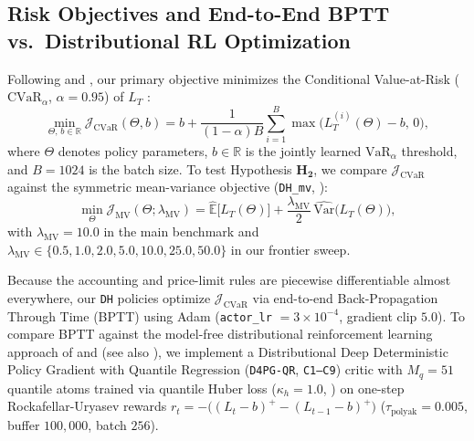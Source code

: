 \documentclass[11pt,a4paper]{article}
\begin{document}
\subsection{Risk Objectives and End-to-End BPTT vs.\ Distributional RL Optimization}
Following \citet{Buehler2019} and \citet{Rockafellar2000}, our primary objective minimizes the Conditional Value-at-Risk ($\text{CVaR}_\alpha$, $\alpha = 0.95$) of $L_T$ \citep{Carbonneau2021,Brugiere2026}:
\begin{equation}
  \min_{\Theta,\, b \in \mathbb{R}} \mathcal{J}_{\text{CVaR}}(\Theta, b) = b + \frac{1}{(1 - \alpha)B}\sum_{i=1}^{B} \max\big(L_T^{(i)}(\Theta) - b,\, 0\big),
  \label{eq:cvar_obj}
\end{equation}
where $\Theta$ denotes policy parameters, $b \in \mathbb{R}$ is the jointly learned $\text{VaR}_\alpha$ threshold, and $B = 1024$ is the batch size. To test Hypothesis $\mathbf{H_2}$, we compare $\mathcal{J}_{\text{CVaR}}$ against the symmetric mean-variance objective (\texttt{DH\_mv}, \citealt{Dai2022}):
\begin{equation}
  \min_{\Theta} \mathcal{J}_{\text{MV}}(\Theta; \lambda_{\text{MV}}) = \widehat{\mathbb{E}}\big[L_T(\Theta)\big] + \frac{\lambda_{\text{MV}}}{2}\,\widehat{\text{Var}}\big(L_T(\Theta)\big),
  \label{eq:mv_obj}
\end{equation}
with $\lambda_{\text{MV}} = 10.0$ in the main benchmark and $\lambda_{\text{MV}} \in \{0.5, 1.0, 2.0, 5.0, 10.0, 25.0, 50.0\}$ in our frontier sweep.

Because the accounting and price-limit rules are piecewise differentiable almost everywhere, our \texttt{DH} policies optimize $\mathcal{J}_{\text{CVaR}}$ via end-to-end Back-Propagation Through Time (BPTT) using Adam (\texttt{actor\_lr} $= 3 \times 10^{-4}$, gradient clip $5.0$). To compare BPTT against the model-free distributional reinforcement learning approach of \citet{Cao2023} and \citet{Pickard2023} (see also \citealt{ChenHu2026}), we implement a Distributional Deep Deterministic Policy Gradient with Quantile Regression (\texttt{D4PG-QR}, \texttt{C1--C9}) critic with $M_q = 51$ quantile atoms trained via quantile Huber loss ($\kappa_h = 1.0$, \citealt{Dabney2018}) on one-step Rockafellar-Uryasev rewards $r_t = -\big((L_t - b)^+ - (L_{t-1} - b)^+\big)$ ($\tau_{\text{polyak}} = 0.005$, buffer $100,000$, batch $256$).

\end{document}
